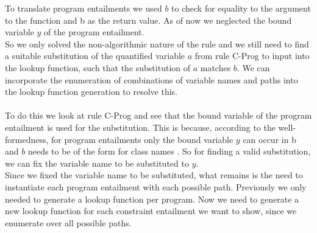 To translate program entailments 
we used $b$ to check for equality to the argument to the function
and \ovl b as the return value.
As of now we neglected the bound variable $y$ of the program entailment.\\
So we only solved the non-algorithmic nature of the rule
and we still need to find a suitable substitution
of the quantified variable $a$ from rule C-Prog
to input into the lookup function, such that the substitution of $a$ matches $b$.
We can incorporate the enumeration of combinations of variable names and paths
into the lookup function generation to resolve this.\\
\\
To do this we look at rule C-Prog and
see that the bound variable of the program entailment is used
for the substitution.
This is because, according to the well-formedness,
for program entailments 
only the bound variable $y$ can occur in \ovl b
and $b$ needs to be of the form 
for class names .
So for finding a valid substitution,
we can fix the variable name to be substituted to $y$.\\
Since we fixed the variable name to be substituted,
what remains is the need to instantiate each program entailment
with each possible path.
Previously we only needed to generate a lookup function per program.
Now we need to generate a new lookup function
for each constraint entailment we want to show,
since we enumerate over all possible paths.

